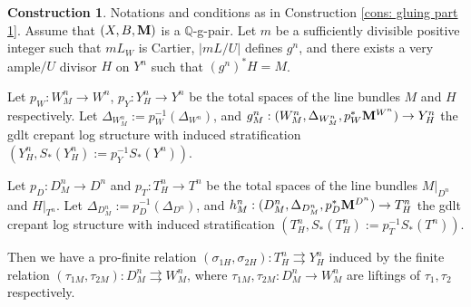 \documentclass[11pt]{amsart}
\numberwithin{equation}{section}
\newcommand{\Mm}{{\bf{M}}}
\theoremstyle{definition}
\theoremstyle{definition}
\newtheorem{cons}[thm]{Construction}
\theoremstyle{definition}
\begin{document}
\begin{cons}\label{cons: glue part 2}
Notations and conditions as in Construction \ref{cons: gluing part 1}. Assume that $(X,B,\Mm)$ is a $\mathbb Q$-g-pair. Let $m$ be a sufficiently divisible positive integer such that $mL_W$ is Cartier, $|mL/U|$ defines $g^n$, and there exists a very ample$/U$ divisor $H$ on $Y^n$ such that $(g^{n})^*H=M$.

Let $p_W: W^n_M\to W^n$, $p_Y: Y^n_H\to Y^n$ be the total spaces of the line bundles $M$ and $H$ respectively. Let $\Delta_{W^n_M}:=p_W^{-1}(\Delta_{W^n})$, and $g^n_M: (W^n_M,\Delta_{W^n_M},p^*_W\Mm^{W^n})\to Y^n_H$ the gdlt crepant log structure with induced stratification $(Y^n_H, S_*(Y^n_H):=p_Y^{-1}S_*(Y^n))$. 

Let $p_D: D^n_M\to D^n$ and $p_T: T^n_H\to T^n$ be the total spaces of the line bundles $M|_{D^n}$ and $H|_{T^n}$. Let $\Delta_{D^n_M}:=p_D^{-1}(\Delta_{D^n})$, and $h^n_M: (D^n_M,\Delta_{D^n_M},p^*_D\Mm^{D^n})\to T^n_H$ the gdlt crepant log structure with induced stratification $(T^n_H, S_*(T^n_H):=p_T^{-1}S_*(T^n))$. 

Then we have a pro-finite relation $(\sigma_{1H},\sigma_{2H}): T^n_H\rightrightarrows Y^n_H$ induced by the finite relation $(\tau_{1M},\tau_{2M}): D^n_M\rightrightarrows W^n_M$, where $\tau_{1M},\tau_{2M}: D^n_M\rightarrow W^n_M$ are liftings of $\tau_{1},\tau_{2}$ respectively.
\end{cons}
\end{document}
